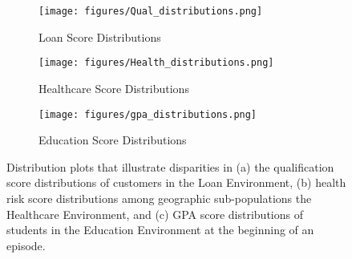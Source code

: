 \label{Sec::Experiments}

\begin{figure*}[ht!]
  \begin{subfigure}{0.28\textwidth}
    \texttt{[image: figures/Qual\_distributions.png]}
    \caption{Loan Score Distributions} \label{fig:qual_dist}
  \end{subfigure}%
  \hspace{0.05\textwidth}   
  \begin{subfigure}{0.28\textwidth}
    \texttt{[image: figures/Health\_distributions.png]}
    \caption{Healthcare Score Distributions} \label{fig:health_dist}
  \end{subfigure}%
  \hspace{0.05\textwidth}
  \begin{subfigure}{0.28\textwidth}
    \texttt{[image: figures/gpa\_distributions.png]}
    \caption{Education Score Distributions} \label{fig:gpa_dists}
  \end{subfigure}%
\caption{Distribution plots that illustrate disparities in (a) the qualification score distributions of customers in the Loan Environment, (b) health risk score distributions among geographic sub-populations the Healthcare Environment, and (c) GPA score distributions of students in the Education Environment at the beginning of an episode.} \label{fig:Distributions}
\end{figure*}

